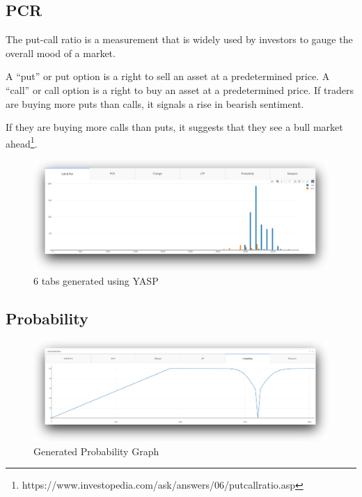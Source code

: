 \begin{multicols}{2}
\hypertarget{pcr}{%
\subsection{PCR}\label{pcr}}

The put-call ratio is a measurement that is widely used by investors to
gauge the overall mood of a market.

A ``put'' or put option is a right to sell an asset at a predetermined
price. A ``call'' or call option is a right to buy an asset at a
predetermined price. If traders are buying more puts than calls, it
signals a rise in bearish sentiment.

\end{multicols}

If they are buying more calls than puts, it suggests that they see a
bull market ahead\footnote{https://www.investopedia.com/ask/answers/06/putcallratio.asp}.

\begin{figure}
\centering
\includegraphics{calput.png}
\caption{6 tabs generated using YASP}
\end{figure}

\hypertarget{probability}{%
\subsection{Probability}\label{probability}}

\begin{figure}
\centering
\includegraphics{prob.png}
\caption{Generated Probability Graph}
\end{figure}

